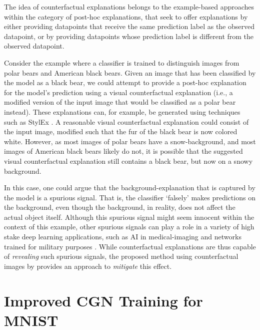 The idea of counterfactual explanations belongs to the example-based approaches within the category of post-hoc explanations, that seek to offer explanations by either providing datapoints that receive the same prediction label as the observed datapoint, or by providing datapoints whose prediction label is different from the observed datapoint.

Consider the example where a classifier is trained to distinguish images from polar bears and American black bears. Given an image that has been classified by the model as a black bear, we could attempt to provide a post-hoc explanation for the model's prediction using a visual counterfactual explanation (i.e., a modified version of the input image that would be classified as a polar bear instead). These explanations can, for example, be generated using techniques such as StylEx \cite{lang2021explaining}. A reasonable visual counterfactual explanation could consist of the input image, modified such that the fur of the black bear is now colored white. However, as most images of polar bears have a snow-background, and most images of American black bears likely do not, it is possible that the suggested visual counterfactual explanation still contains a black bear, but now on a snowy background.

In this case, one could argue that the background-explanation that is captured by the model is a spurious signal. That is, the classifier `falsely' makes predictions on the background, even though the background, in reality, does not affect the actual object itself. Although this spurious signal might seem innocent within the context of this example, other spurious signals can play a role in a variety of high stake deep learning applications, such as AI in medical-imaging \cite{degrave2021ai} and networks trained for military purposes \cite{guidotti2018survey}. While counterfactual explanations are thus capable of \emph{revealing} such spurious signals, the proposed method using counterfactual images by \citeauthor{Sauer2021ICLR} provides an approach to \emph{mitigate} this effect.


\section{Improved CGN Training for MNIST} \label{sec:edge_loss_appendix}

